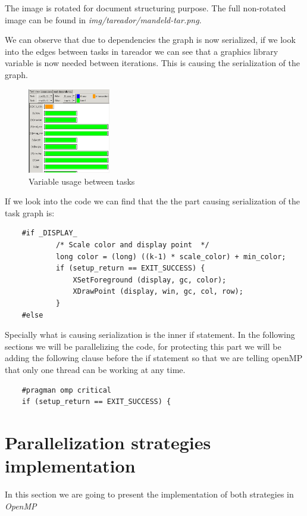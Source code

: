 \documentclass{article}
\begin{document}
\begin{flushleft}
The image is rotated for document structuring purpose. The full non-rotated image can be found in \textit{img/tareador/mandeld-tar.png}.
\end{flushleft}
\begin{flushleft}
We can observe that due to dependencies the graph is now serialized, if we look into the edges between tasks in tareador we can see that a graphics library variable is now needed between iterations. This is causing the serialization of the graph.
\end{flushleft}
\begin{figure}[h]
    \centering
    \includegraphics[width=0.32\textwidth]{mandeld-tar-edge.png}
    \caption{Variable usage between tasks}
    \label{fig:mandeldtaredge}
\end{figure}
\begin{flushleft}
If we look into the code we can find that the the part causing serialization of the task graph is:
\end{flushleft}
\begin{lstlisting}
    #if _DISPLAY_
            /* Scale color and display point  */
            long color = (long) ((k-1) * scale_color) + min_color;
            if (setup_return == EXIT_SUCCESS) {
                XSetForeground (display, gc, color);
                XDrawPoint (display, win, gc, col, row);
            }
    #else
\end{lstlisting}
\begin{flushleft}
Specially what is causing serialization is the inner if statement. In the following sections we will be parallelizing the code, for protecting this part we will be adding the following clause before the if statement so that we are telling openMP that only one thread can be working at any time.
\end{flushleft}
\begin{lstlisting}
    #pragman omp critical
    if (setup_return == EXIT_SUCCESS) {
\end{lstlisting}
\newpage
\section{Parallelization strategies implementation}
In this section we are going to present the implementation of both strategies in \textit{OpenMP}
\end{document}
